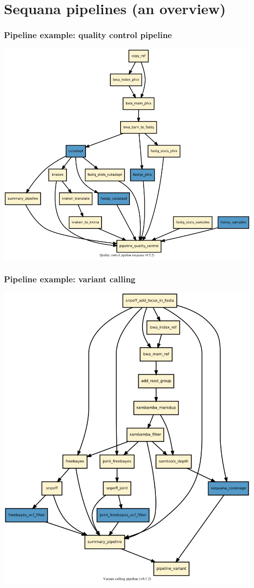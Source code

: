 \documentclass{beamer}
\begin{document}
\section{Sequana pipelines (an overview)}


\begin{frame}
\frametitle{Pipeline example: quality control pipeline} 
\centering
\includegraphics[height=0.8\textheight, width=\textwidth]{./images/dag.png}
\end{frame}



\begin{frame}
\frametitle{Pipeline example: variant calling} 
\centering
\includegraphics[height=0.8\textheight, 
width=\textwidth]{./images/variant_calling_dag.png}
\end{frame}
\end{document}
